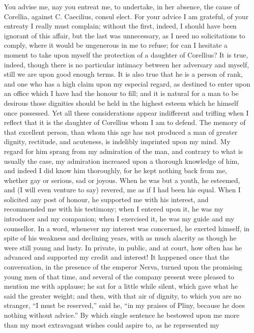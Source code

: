 You advise me, nay you entreat me, to undertake, in her absence, the cause
of Corellia, against C. Caecilius, consul elect. For your advice I am
grateful, of your entreaty I really must complain; without the first,
indeed, I should have been ignorant of this affair, but the last was
unnecessary, as I need no solicitations to comply, where it would be
ungenerous in me to refuse; for can I hesitate a moment to take upon
myself the protection of a daughter of Corellius? It is true, indeed,
though there is no particular intimacy between her adversary and myself,
still we are upon good enough terms. It is also true that he is a person
of rank, and one who has a high claim upon my especial regard, as destined
to enter upon an office which I have had the honour to fill; and it is
natural for a man to be desirous those dignities should be held in the
highest esteem which he himself once possessed. Yet all these
considerations appear indifferent and trifling when I reflect that it is
the daughter of Corellius whom I am to defend. The memory of that
excellent person, than whom this age has not produced a man of greater
dignity, rectitude, and acuteness, is indelibly imprinted upon my mind. My
regard for him sprang from my admiration of the man, and contrary to what
is usually the case, my admiration increased upon a thorough knowledge of
him, and indeed I did know him thoroughly, for he kept nothing back from
me, whether gay or serious, sad or joyous. When he was but a youth, he
esteemed, and (I will even venture to say) revered, me as if I had been
his equal. When I solicited any post of honour, he supported me with his
interest, and recommended me with his testimony; when I entered upon it,
he was my introducer and my companion; when I exercised it, he was my
guide and my counsellor. In a word, whenever my interest was concerned, he
exerted himself, in spite of his weakness and declining years, with as
much alacrity as though he were still young and lusty. In private, in
public, and at court, how often has he advanced and supported my credit
and interest! It happened once that the conversation, in the presence of
the emperor Nerva, turned upon the promising young men of that time, and
several of the company present were pleased to mention me with applause;
he sat for a little while silent, which gave what he said the greater
weight; and then, with that air of dignity, to which you are no stranger,
``I must be reserved,'' said he, ``in my praises of Pliny, because he does
nothing without advice.'' By which single sentence he bestowed upon me more
than my most extravagant wishes could aspire to, as he represented my
